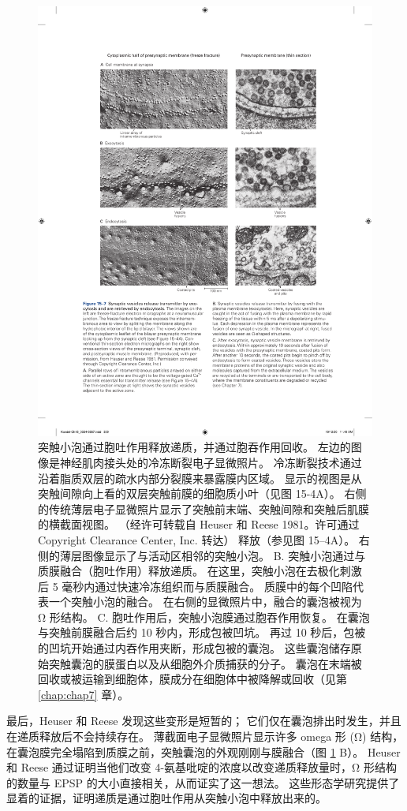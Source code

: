 \begin{figure}[htbp]
	\centering
	\includegraphics[width=0.8\linewidth]{chap15/fig_15_7}
	\caption{突触小泡通过胞吐作用释放递质，并通过胞吞作用回收。 左边的图像是神经肌肉接头处的冷冻断裂电子显微照片。 冷冻断裂技术通过沿着脂质双层的疏水内部分裂膜来暴露膜内区域。 显示的视图是从突触间隙向上看的双层突触前膜的细胞质小叶（见图 15-4A）。 右侧的传统薄层电子显微照片显示了突触前末端、突触间隙和突触后肌膜的横截面视图。 （经许可转载自 Heuser 和 Reese 1981。许可通过 Copyright Clearance Center, Inc. 转达） 释放（参见图 15–4A）。 右侧的薄层图像显示了与活动区相邻的突触小泡。 B. 突触小泡通过与质膜融合（胞吐作用）释放递质。 在这里，突触小泡在去极化刺激后 5 毫秒内通过快速冷冻组织而与质膜融合。 质膜中的每个凹陷代表一个突触小泡的融合。 在右侧的显微照片中，融合的囊泡被视为 Ω 形结构。 C. 胞吐作用后，突触小泡膜通过胞吞作用恢复。 在囊泡与突触前膜融合后约 10 秒内，形成包被凹坑。 再过 10 秒后，包被的凹坑开始通过内吞作用夹断，形成包被的囊泡。 这些囊泡储存原始突触囊泡的膜蛋白以及从细胞外介质捕获的分子。 囊泡在末端被回收或被运输到细胞体，膜成分在细胞体中被降解或回收（见第 \ref{chap:chap7} 章）。}
	\label{fig:15_7}
\end{figure}


最后，Heuser 和 Reese 发现这些变形是短暂的； 它们仅在囊泡排出时发生，并且在递质释放后不会持续存在。 
薄截面电子显微照片显示许多 omega 形 (Ω) 结构，在囊泡膜完全塌陷到质膜之前，突触囊泡的外观刚刚与膜融合（图 \ref{fig:15_7} B）。 
Heuser 和 Reese 通过证明当他们改变 4-氨基吡啶的浓度以改变递质释放量时，Ω 形结构的数量与 EPSP 的大小直接相关，从而证实了这一想法。 
这些形态学研究提供了显着的证据，证明递质是通过胞吐作用从突触小泡中释放出来的。


